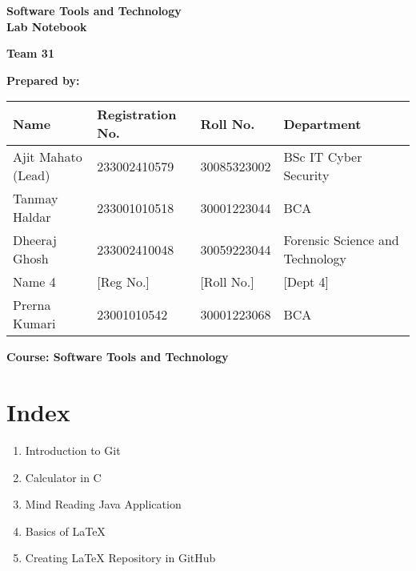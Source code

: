 \begin{titlepage}
    \centering
    \vspace*{2cm}
    
    {\Huge\bfseries Software Tools and Technology \\[0.4cm] Lab Notebook \\[2cm]}
    
    {\Large\textbf{Team 31}\\[1.5cm]}
    
    \vspace{0.5cm}
    \textbf{Prepared by:}\\[0.5cm]
    
    \vspace{1cm}
    \begin{tabular}{|l|l|l|l|}
    \hline
    \textbf{Name} & \textbf{Registration No.} & \textbf{Roll No.} & \textbf{Department} \\
    \hline
     Ajit Mahato (Lead)& 233002410579& 30085323002& BSc IT Cyber Security\\
    Tanmay Haldar &233001010518 & 30001223044 & BCA \\
    Dheeraj Ghosh & 233002410048 & 30059223044 & Forensic Science and Technology \\
    Name 4 & [Reg No.] & [Roll No.] & [Dept 4] \\
    Prerna Kumari &23001010542 &30001223068 &BCA \\
    \hline
    \end{tabular}
    
    \vspace{2cm}
    
    \vfill
    \textbf{Course: Software Tools and Technology}
    
\end{titlepage}

\newpage
\chapter*{Index}
\thispagestyle{empty} %

\begin{enumerate}
    \item Introduction to Git
    \item Calculator in C\dotfill 
    \item Mind Reading Java Application\dotfill 
    \item Basics of LaTeX\dotfill 
    \item Creating LaTeX Repository in GitHub\dotfill 
\end{enumerate}
